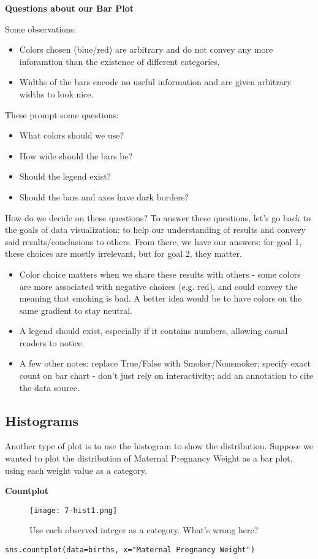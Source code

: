 \textbf{Questions about our Bar Plot}

Some observations:
\begin{itemize}
\item Colors chosen (blue/red) are arbitrary and do not convey any more inforamtion than the existence of different categories.
\item Widths of the bars encode no useful information and are given arbitrary widths to look nice.
\end{itemize}
These prompt some questions:
\begin{itemize}
\item What colors should we use?
\item How wide should the bars be?
\item Should the legend exist?
\item Should the bars and axes have dark borders?
\end{itemize}
How do we decide on these questions? To answer these questions, let's go back to the goals of data visualization: to help our understanding of results and convery said results/conclusions to others. From there, we have our answers: for goal 1, these choices are mostly irrelevant, but for goal 2, they matter.
\begin{itemize}
\item Color choice matters when we share these results with others - some colors are more associated with negative choices (e.g. red), and could convey the meaning that smoking is bad. A better idea would be to have colors on the same gradient to stay neutral.
\item A legend should exist, especially if it contains numbers, allowing casual readers to notice.
\item A few other notes: replace True/False with Smoker/Nonsmoker; specify exact count on bar chart - don't just rely on interactivity; add an annotation to cite the data source.
\end{itemize}

\subsection{Histograms}
Another type of plot is to use the histogram to show the distribution. Suppose we wanted to plot the distribution of Maternal Pregnancy Weight as a bar plot, using each weight value as a category.

\textbf{Countplot}
\begin{figure}[ht]
\texttt{[image: 7-hist1.png]}\centering\caption{Use each observed integer as a category. What's wrong here?}
\end{figure}
\begin{verbatim}
sns.countplot(data=births, x="Maternal Pregnancy Weight")
\end{verbatim}


